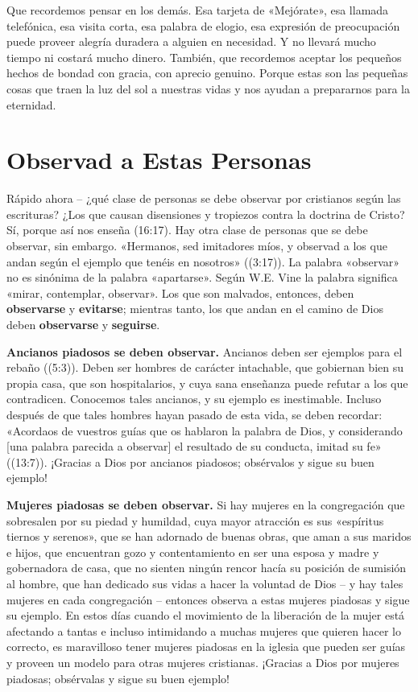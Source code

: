 \documentclass[12pt, twoside, openright]{book}
\begin{document}
Que recordemos pensar en los demás. Esa tarjeta de «Mejórate», esa llamada telefónica, esa visita corta, esa palabra de elogio, esa expresión de preocupación puede proveer alegría duradera a alguien en necesidad. Y no llevará mucho tiempo ni costará mucho dinero. También, que recordemos aceptar los pequeños hechos de bondad con gracia, con aprecio genuino. Porque estas son las pequeñas cosas que traen la luz del sol a nuestras vidas y nos ayudan a prepararnos para la eternidad.

\section{Observad a Estas Personas}
Rápido ahora – ¿qué clase de personas se debe observar por cristianos según las escrituras? ¿Los que causan disensiones y tropiezos contra la doctrina de Cristo? Sí, porque así nos enseña (16:17).
Hay otra clase de personas que se debe observar, sin embargo. «Hermanos, sed imitadores míos, y observad a los que andan según el ejemplo que tenéis en nosotros» ((3:17)). La palabra «observar» no es sinónima de la palabra «apartarse». Según W.E. Vine la palabra significa «mirar, contemplar, observar». Los que son malvados, entonces, deben \textbf{observarse} y \textbf{evitarse}; mientras tanto, los que andan en el camino de Dios deben \textbf{observarse} y \textbf{seguirse}. 

\textbf{Ancianos piadosos se deben observar.} Ancianos deben ser ejemplos para el rebaño ((5:3)). Deben ser hombres de carácter intachable, que gobiernan bien su propia casa, que son hospitalarios, y cuya sana enseñanza puede refutar a los que contradicen. Conocemos tales ancianos, y su ejemplo es inestimable. Incluso después de que tales hombres hayan pasado de esta vida, se deben recordar: «Acordaos de vuestros guías que os hablaron la palabra de Dios, y considerando [una palabra parecida a observar] el resultado de su conducta, imitad su fe» ((13:7)). ¡Gracias a Dios por ancianos piadosos; obsérvalos y sigue su buen ejemplo!

\textbf{Mujeres piadosas se deben observar.} Si hay mujeres en la congregación que sobresalen por su piedad y humildad, cuya mayor atracción es sus «espíritus tiernos y serenos», que se han adornado de buenas obras, que aman a sus maridos e hijos, que encuentran gozo y contentamiento en ser una esposa y madre y gobernadora de casa, que no sienten ningún rencor hacía su posición de sumisión al hombre, que han dedicado sus vidas a hacer la voluntad de Dios – y hay tales mujeres en cada congregación – entonces observa a estas mujeres piadosas y sigue su ejemplo. En estos días cuando el movimiento de la liberación de la mujer está afectando a tantas e incluso intimidando a muchas mujeres que quieren hacer lo correcto, es maravilloso tener mujeres piadosas en la iglesia que pueden ser guías y proveen un modelo para otras mujeres cristianas. ¡Gracias a Dios por mujeres piadosas; obsérvalas y sigue su buen ejemplo!
\end{document}
